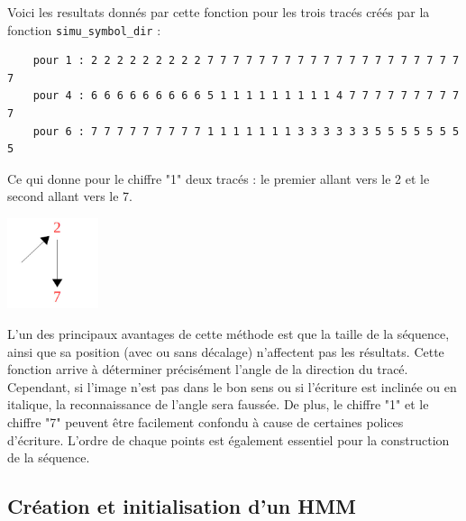 Voici les resultats donnés par cette fonction pour les trois tracés créés par la fonction \texttt{simu\_symbol\_dir} :
\begin{lstlisting}
	pour 1 : 2 2 2 2 2 2 2 2 2 7 7 7 7 7 7 7 7 7 7 7 7 7 7 7 7 7 7 7 7 7 
	pour 4 : 6 6 6 6 6 6 6 6 6 5 1 1 1 1 1 1 1 1 1 4 7 7 7 7 7 7 7 7 7 7 
	pour 6 : 7 7 7 7 7 7 7 7 7 1 1 1 1 1 1 1 3 3 3 3 3 3 5 5 5 5 5 5 5 5 
\end{lstlisting}
Ce qui donne pour le chiffre "1" deux tracés : le premier allant vers le 2 et le second allant vers le 7.
\begin{center}
	\includegraphics[width=0.20\textwidth]{Figures/direction_results.jpg}
\end{center}

L'un des principaux avantages de cette méthode est que la taille de la séquence, ainsi que sa position (avec ou sans décalage) n'affectent pas les résultats. Cette fonction arrive à déterminer précisément l'angle de la direction du tracé. Cependant, si l'image n'est pas dans le bon sens ou si l'écriture est inclinée ou en italique, la reconnaissance de l'angle sera faussée. De plus, le chiffre "1" et le chiffre "7" peuvent être facilement confondu à cause de certaines polices d'écriture. L'ordre de chaque points est également essentiel pour la construction de la séquence.


\subsection{Création et initialisation d'un HMM}

